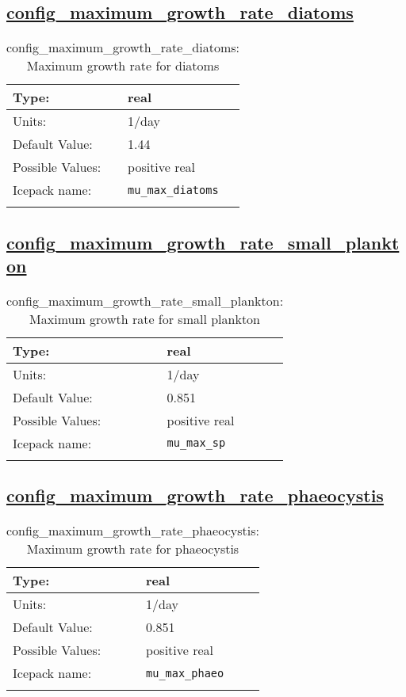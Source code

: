 \subsection[config\_maximum\_growth\_rate\_diatoms]{\hyperref[sec:nm_tab_biogeochemistry]{config\_maximum\_growth\_rate\_diatoms}}
\label{subsec:nm_sec_config_maximum_growth_rate_diatoms}
\begin{center}
\begin{longtable}{| p{2.0in} || p{4.0in} |}
    \hline
    Type: & real \\
    \hline
    Units: & \si{1/day} \\
    \hline
    Default Value: & 1.44 \\
    \hline
    Possible Values: & positive real \\
    \hline
    Icepack name: & \verb+mu_max_diatoms+ \\
    \hline
    \caption{config\_maximum\_growth\_rate\_diatoms: Maximum growth rate for diatoms}
\end{longtable}
\end{center}
\subsection[config\_maximum\_growth\_rate\_small\_plankton]{\hyperref[sec:nm_tab_biogeochemistry]{config\_maximum\_growth\_rate\_small\_plankton}}
\label{subsec:nm_sec_config_maximum_growth_rate_small_plankton}
\begin{center}
\begin{longtable}{| p{2.0in} || p{4.0in} |}
    \hline
    Type: & real \\
    \hline
    Units: & \si{1/day} \\
    \hline
    Default Value: & 0.851 \\
    \hline
    Possible Values: & positive real \\
    \hline
    Icepack name: & \verb+mu_max_sp+ \\
    \hline
    \caption{config\_maximum\_growth\_rate\_small\_plankton: Maximum growth rate for small plankton}
\end{longtable}
\end{center}
\subsection[config\_maximum\_growth\_rate\_phaeocystis]{\hyperref[sec:nm_tab_biogeochemistry]{config\_maximum\_growth\_rate\_phaeocystis}}
\label{subsec:nm_sec_config_maximum_growth_rate_phaeocystis}
\begin{center}
\begin{longtable}{| p{2.0in} || p{4.0in} |}
    \hline
    Type: & real \\
    \hline
    Units: & \si{1/day} \\
    \hline
    Default Value: & 0.851 \\
    \hline
    Possible Values: & positive real \\
    \hline
    Icepack name: & \verb+mu_max_phaeo+ \\
    \hline
    \caption{config\_maximum\_growth\_rate\_phaeocystis: Maximum growth rate for phaeocystis}
\end{longtable}
\end{center}
